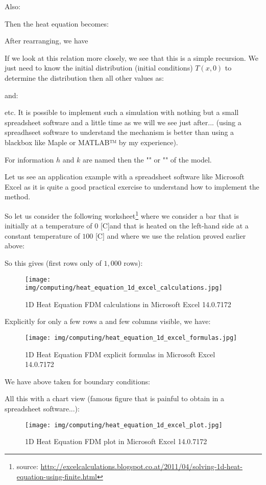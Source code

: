 	Also:
	
	Then the heat equation becomes:
	
	After rearranging, we have
	
	If we look at this relation more closely, we see that this is a simple recursion. We just need to know the initial distribution (initial conditions) $T(x,0)$ to determine the distribution then all other values as:
	
	and:
	
	etc.
	It is possible to implement such a simulation with nothing but a small spreadsheet software and a little time as we will we see just after... (using a spreadhseet software to understand the mechanism is better than using a blackbox like Maple or MATLAB™ by my experience).

	For information $h$ and $k$ are named then the "" or "" of the model.
	
	Let us see an application example with a spreadsheet software like Microsoft Excel as it is quite a good practical exercise to understand how to implement the method.
	
	So let us consider the following worksheet\footnote{source: \url{http://excelcalculations.blogspot.co.at/2011/04/solving-1d-heat-equation-using-finite.html}} where we consider a bar that is initially at a temperature of $0$ [C]and that is heated on the left-hand side at a constant temperature of $100$ [C] and where we use the relation proved earlier above:
	
	So this gives (first rows only of $1,000$ rows): 
	\begin{figure}[H]
		\centering
		\texttt{[image: img/computing/heat\_equation\_1d\_excel\_calculations.jpg]}
		\caption{1D Heat Equation FDM calculations in Microsoft Excel 14.0.7172}
	\end{figure}
	Explicitly for only a few rows a and few columns visible, we have:
	\begin{figure}[H]
		\centering
		\texttt{[image: img/computing/heat\_equation\_1d\_excel\_formulas.jpg]}
		\caption{1D Heat Equation FDM explicit formulas in Microsoft Excel 14.0.7172}
	\end{figure}
	We have above taken for boundary conditions:
	 
	
	All this with a chart view (famous figure that is painful to obtain in a spreadsheet software...):
	\begin{figure}[H]
		\centering
		\texttt{[image: img/computing/heat\_equation\_1d\_excel\_plot.jpg]}
		\caption{1D Heat Equation FDM plot in Microsoft Excel 14.0.7172}
	\end{figure}
	

